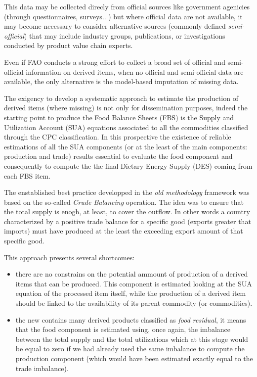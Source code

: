 \documentclass[nojss]{jss}
\begin{document}
This data may be collected direcly from official sources like government agenicies (through questionnaires, surveys.. ) but where official data are not available, it may become necessary to consider alternative sources (commonly defined \textit{semi-official}) that may include industry groups, publications, or investigations conducted by product value chain experts.

Even if FAO conducts a strong effort to collect a broad set of official and semi-official information on derived items, when no official and semi-official data are available, the only alternative is the model-based imputation of missing data. 

The exigency to develop a systematic approach to estimate the production of derived items (where missing) is not only for dissemination purposes, indeed the starting point to produce the Food Balance Sheets (FBS) is the Supply and Utilization Account (SUA) equations associated to all the commodities classified through the CPC classification. In this prospective the existence of  reliable estimations of all the SUA components (or at the least of the main components: production and trade) results essential to evaluate the food component and consequently to compute the the final Dietary Energy Supply (DES) coming from each FBS item.

The enstablished best practice developped in the \textit{ old methodology} framework was based on the so-called \textit{Crude Balancing} operation. The idea was to ensure that the total supply is enogh, at least, to cover the outflow. In other words a country characterized by a positive trade balance for a specific good (exports greater that imports) must have produced at the least the exceeding export amount of that specific good.

This approach presents several shortcomes:
\begin{itemize}

\item {there are no constrains on the potential ammount of production of a derived items that can be produced. This component is estimated looking at the SUA equation of the processed item itself, while the production of a derived item should be linked to the availability of its parent commodity (or commodities).}
\item { the new  contains many derived products classified as \textit{food residual}, it means that the food component is estimated using, once again, the imbalance between the total supply and the total utilizations which at this stage would be equal to zero if we had already used the same imbalance to compute the production component (which would have been estimated exactly equal to the trade imbalance).}
\end{itemize}
\end{document}

